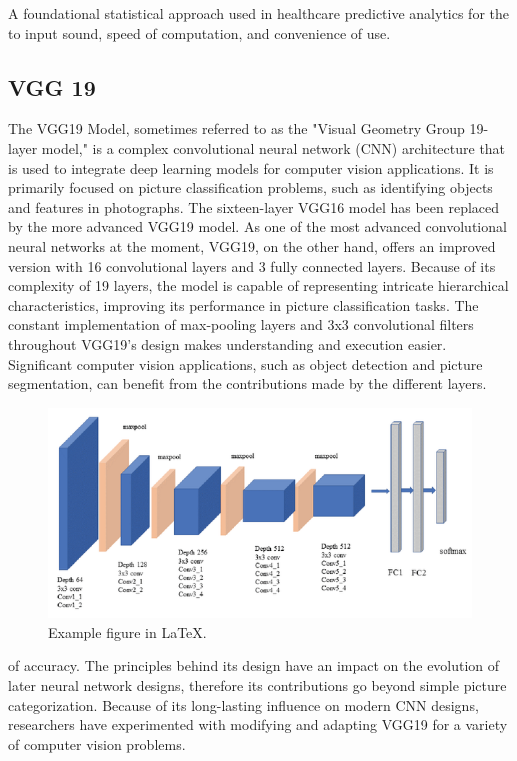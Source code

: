 A foundational statistical approach used in healthcare predictive analytics for the to input sound, speed of computation, and convenience of use.
\subsection{VGG 19}
The VGG19 Model, sometimes referred to as the "Visual Geometry Group 19-layer model," is a complex convolutional neural network (CNN) architecture that is used to integrate deep learning models for computer vision applications. It is primarily focused on picture classification problems, such as identifying objects and features in photographs. The sixteen-layer VGG16 model has been replaced by the more advanced VGG19 model. As one of the most advanced convolutional neural networks at the moment, VGG19, on the other hand, offers an improved version with 16 convolutional layers and 3 fully connected layers. Because of its complexity of 19 layers, the model is capable of representing intricate hierarchical characteristics, improving its performance in picture classification tasks. The constant implementation of max-pooling layers and 3x3 convolutional filters throughout VGG19's design makes understanding and execution easier. Significant computer vision applications, such as object detection and picture segmentation, can benefit from the contributions made by the different layers.
\begin{figure}[ht]
    \centering
    \includegraphics[scale=0.8]{figures/Picture1.png}
    \caption{Example figure in \LaTeX.}
    \label{fig:chart_a}
\end{figure}
of accuracy. The principles behind its design have an impact on the evolution of later neural network designs, therefore its contributions go beyond simple picture categorization. Because of its long-lasting influence on modern CNN designs, researchers have experimented with modifying and adapting VGG19 for a variety of computer vision problems.

